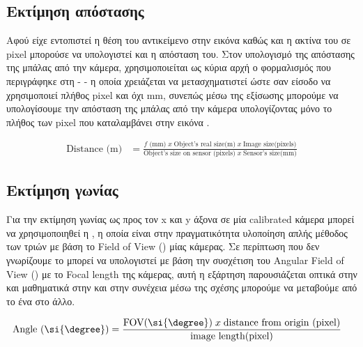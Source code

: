 
\subsection{Εκτίμηση απόστασης}
Αφού είχε εντοπιστεί η θέση του αντικείμενο στην εικόνα καθώς και η ακτίνα του σε pixel μπορούσε να υπολογιστεί και η απόσταση του. 
Στον υπολογισμό της απόστασης της μπάλας από την κάμερα, χρησιμοποιείται ως κύρια αρχή ο φορμαλισμός που περιγράφηκε στη  -  - η οποία χρειάζεται να μετασχηματιστεί ώστε σαν είσοδο να χρησιμοποιεί πλήθος pixel και όχι mm, συνεπώς μέσω της εξίσωσης  μπορούμε να υπολογίσουμε την απόσταση της μπάλας από την κάμερα υπολογίζοντας μόνο το πλήθος των pixel που καταλαμβάνει στην εικόνα \cite{calculate-distance-stackexchange} \cite{calculate-distance-or-size-of-an-objectin-a-photo-image}.

\begin{align}
	\textrm{Distance (m)} &= \frac{\textrm{$f$ (mm)}\; x\;\textrm{Object's real size(m)}\; x\; \textrm{Image size(pixels)}}{\textrm{Object's size on sensor (pixels)}\; x\; \textrm{Sensor's size(mm)}} \label{eq:distance-from-object-pixels}
\end{align}


\subsection{Εκτίμηση γωνίας}
Για την εκτίμηση γωνίας ως προς τον x και y άξονα σε μία calibrated κάμερα μπορεί να χρησιμοποιηθεί η , η οποία είναι στην πραγματικότητα υλοποίηση απλής μέθοδος των τριών με βάση το Field of View () μίας κάμερας. Σε περίπτωση που δεν γνωρίζουμε το  μπορεί να υπολογιστεί με βάση την συσχέτιση του Angular Field of View () με το Focal length
της κάμερας, αυτή η εξάρτηση παρουσιάζεται οπτικά στην  και μαθηματικά στην  \cite{afov-focal-length-rela} και στην συνέχεια μέσω της σχέσης  μπορούμε να μεταβούμε από το ένα στο άλλο. 

\begin{align}
	\textrm{Angle (\si{\degree})} &= \frac{\textrm{FOV(\si{\degree})}\; x\;\textrm{distance from origin (pixel)}}{\textrm{image length(pixel)}} \label{eq:angle-from-object-center-pixels}
\end{align}

